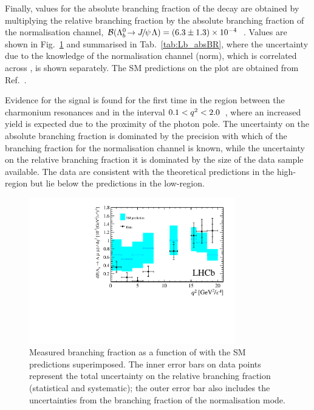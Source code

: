 Finally, values for the absolute branching fraction of the \decay{\Lb}{\Lz\mumu} decay are obtained by multiplying 
the relative branching fraction by the absolute branching fraction of the normalisation channel,
$\BF(\decay{\Lb}{\jpsi\Lz})=(6.3\pm1.3)\times10^{-4}$~\cite{PDG2014}.
Values are shown in Fig.~\ref{fig:Lb_absBR} and summarised in Tab.~\ref{tab:Lb_absBR}, where the uncertainty
due to the knowledge of the normalisation channel (norm), which is correlated across \qsq, is shown separately.
The SM predictions on the plot are obtained from Ref.~\cite{Detmold:2012vy}.  

Evidence for the signal is found for the first time in the \qsq region between the charmonium 
resonances and in the interval \mbox{$0.1 < q^2 < 2.0$~\gevgevcccc}, where an increased 
yield is expected due to the proximity of the photon pole. The uncertainty on the absolute branching
fraction is dominated by the precision with which of the branching fraction for the normalisation channel is known,
while the uncertainty on the relative branching fraction it is dominated by the size of the data sample available. 
The data are consistent with the theoretical predictions in the high-\qsq region but lie below the predictions in the low-\qsq region.

\begin{figure}
\centering
\includegraphics[width=0.8\textwidth]{Lmumu/figs/paper/figure5.pdf}
\caption{Measured \protect\decay{\Lb}{\Lz\mumu} branching
   fraction as a function of \qsq with the SM predictions
   \cite{Detmold:2012vy} superimposed.  The inner error bars on data
   points represent the total uncertainty on the relative branching
   fraction (statistical and systematic); the outer error bar also
   includes the uncertainties from the branching fraction of the
   normalisation mode.}  
\label{fig:Lb_absBR}
\end{figure}

